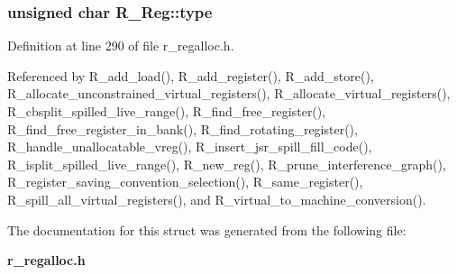 \subsubsection{\setlength{\rightskip}{0pt plus 5cm}unsigned char \bf{R\_\-Reg::type}}\label{structR__Reg_8fb89a4e3aecd604da56c67ef8aba11d}




Definition at line 290 of file r\_\-regalloc.h.

Referenced by R\_\-add\_\-load(), R\_\-add\_\-register(), R\_\-add\_\-store(), R\_\-allocate\_\-unconstrained\_\-virtual\_\-registers(), R\_\-allocate\_\-virtual\_\-registers(), R\_\-cbsplit\_\-spilled\_\-live\_\-range(), R\_\-find\_\-free\_\-register(), R\_\-find\_\-free\_\-register\_\-in\_\-bank(), R\_\-find\_\-rotating\_\-register(), R\_\-handle\_\-unallocatable\_\-vreg(), R\_\-insert\_\-jsr\_\-spill\_\-fill\_\-code(), R\_\-isplit\_\-spilled\_\-live\_\-range(), R\_\-new\_\-reg(), R\_\-prune\_\-interference\_\-graph(), R\_\-register\_\-saving\_\-convention\_\-selection(), R\_\-same\_\-register(), R\_\-spill\_\-all\_\-virtual\_\-registers(), and R\_\-virtual\_\-to\_\-machine\_\-conversion().

The documentation for this struct was generated from the following file:\begin{CompactItemize}
\item 
\bf{r\_\-regalloc.h}\end{CompactItemize}
